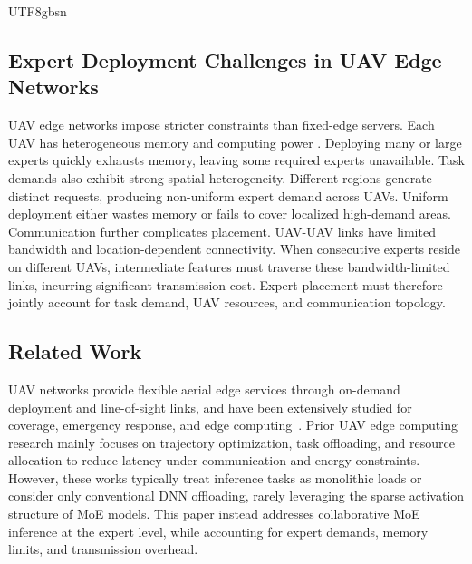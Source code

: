 \documentclass[journal]{IEEEtran}
\begin{document}
\begin{CJK*}{UTF8}{gbsn}
\subsection{Expert Deployment Challenges in UAV Edge Networks}
UAV edge networks impose stricter constraints than fixed-edge servers. Each UAV has heterogeneous memory and computing power {\color{black}\cite{R20,R21}}. Deploying many or large experts quickly exhausts memory, leaving some required experts unavailable.
Task demands also exhibit strong spatial heterogeneity. Different regions generate distinct requests, producing non-uniform expert demand across UAVs{\color{black}\cite{R22}}. Uniform deployment either wastes memory or fails to cover localized high-demand areas.
Communication further complicates placement. UAV-UAV links have limited bandwidth and location-dependent connectivity{\color{black}\cite{R23}}. When consecutive experts reside on different UAVs, intermediate features must traverse these bandwidth-limited links, incurring significant transmission cost{\color{black}\cite{R24}}. Expert placement must therefore jointly account for task demand, UAV resources, and communication topology.

\subsection{Related Work}
\label{sec:related}

UAV networks provide flexible aerial edge services through on-demand deployment and line-of-sight links, and have been extensively studied for coverage, emergency response, and edge computing~\cite{mozaffari2019uav,zhu2019uav}. Prior UAV edge computing research mainly focuses on trajectory optimization, task offloading, and resource allocation to reduce latency under communication and energy constraints. However, these works typically treat inference tasks as monolithic loads or consider only conventional DNN offloading, rarely leveraging the sparse activation structure of MoE models. This paper instead addresses collaborative MoE inference at the expert level, while accounting for expert demands, memory limits, and transmission overhead.


\end{CJK*}
\end{document}
